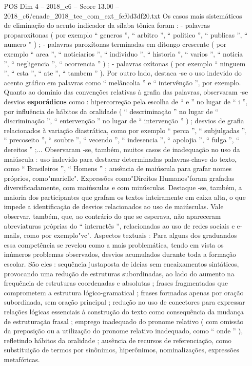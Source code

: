 \begin{textsample}{POS Dim 4 – 2018\_c6 – Score 13.00 – 2018\_c6/enade\_2018\_tec\_com\_ext\_fef0d3df20.txt}
Os casos mais sistemáticos de eliminação do acento indicador da sílaba tônica foram : - palavras proparoxítonas ( por exemplo “ generos ”, “ arbitro ”, “ politico ”, “ publicas ”, “ numero ” ) ; - palavras paroxítonas terminadas em ditongo crescente ( por exemplo “ area ”, “ noticiarios ”, “ individuo ”, “ historia ”, “ varios ”, “ noticia ”, “ negligencia ”, “ ocorrencia ” ) ; - palavras oxítonas ( por exemplo “ ninguem ”, “ esta ”, “ ate ”, “ tambem ” ).
Por outro lado, destaca -se o uso indevido do acento gráfico em palavras como “ melâncolia ” e “ intervênção ”, por exemplo.
Quanto ao domínio das convenções relativas à grafia das palavras, observaram -se desvios \textbf{esporádicos} como : hipercorreção pela escolha de “ e ” no lugar de “ i ”, por influência de hábitos da oralidade ( “ descriminação ” no lugar de “ discriminação ”, “ entervenção ” no lugar de “ intervenção ” ) ; desvios de grafia relacionados à variação diastrática, como por exemplo “ perca ”, “ subjulgadas ”, “ precoseito ”, “ soubre ”, “ vecendo ”, “ indesencia ”, “ apolojia ”, “ fulga ”, “ dereitos ” ;...
Observaram -se, também, muitos casos de inadequação no uso da maiúscula : uso indevido para destacar determinadas palavras-chave do texto, como “ Brasileiros ”, “ Homens ” ; ausência de maiúscula para grafar nomes próprios, como"marielle".
Expressões como"Direitos Humanos"foram grafadas diversificadamente, com maiúsculas e com minúsculas.
Destaque -se, também, a maioria dos participantes que grafam os textos inteiramente em caixa alta, o que impede a identificação de desvios relacionados ao uso de maiúsculas.
Vale observar, também, que, ao contrário do que se esperava, não apareceram abreviaturas próprias do “ internetês ”, relacionadas ao uso de redes sociais e e-mails, como por exemplo"vc".
Aspectos textuais : Para alguns dos graduandos essa competência se revelou como a mais problemática, tendo em vista os inúmeros problemas observados, desvios acumulados durante toda a formação escolar.
São eles : sequência justaposta de ideias sem encaixamentos sintáticos, provocando uma redução de estruturas subordinadas, ao lado do aumento na frequência de estruturas coordenadas e absolutas ; frases fragmentadas que comprometem a estrutura lógico-gramatical ; frases formadas apenas por oração subordinada, sem oração principal ; redução no uso de conectores para expressar relações lógicas essenciais à construção do texto como consequência da mudança de estruturação frasal ; emprego inadequado do pronome relativo ( com omissão da preposição ou a utilização do pronome relativo inadequado, como “ onde ” ), refletindo hábitos da oralidade ; ausência de recursos de referenciação, como substituição de termos por sinônimos, hiperônimos, nominalizações, expressões metafóricas.

\end{textsample}
